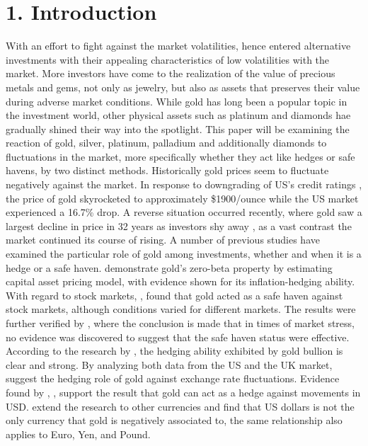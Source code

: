 \documentclass[preprint,authoryear,11pt]{elsarticle}
\begin{document}


\newpage
\section{1. Introduction}
\label{sec:introduction} \glsresetall

\noindent With an effort to fight against the market volatilities, hence entered alternative investments with their appealing characteristics of low volatilities with the market. More investors have come to the realization of the value of precious metals and gems, not only as jewelry, but also as assets that preserves their value during adverse market conditions. While gold has long been a popular topic in the investment world, other physical assets such as platinum and diamonds hae gradually shined their way into the spotlight. This paper will be examining the reaction of gold, silver, platinum, palladium and additionally diamonds to fluctuations in the market, more specifically whether they act like hedges or safe havens, by two distinct methods.
\newline\newline
\noindent Historically gold prices seem to fluctuate negatively against the market. In response to downgrading of US's credit ratings \citet{2011}, the price of gold skyrocketed to approximately \$1900/ounce while the US market experienced a 16.7\% drop. A reverse situation occurred recently, where gold saw a largest decline in price in 32 years as investors shy away \citet{keylist}, as a vast contrast the market continued its course of rising.
\newline\newline
\noindent A number of previous studies have examined the particular role of gold among investments, whether and when it is a hedge or a safe haven. \citet{mccown_is_2006} demonstrate gold's zero-beta property by estimating capital asset pricing model, with evidence shown for its inflation-hedging ability. With regard to stock markets, \citet{baur_is_2009}, \citet{baur_is_2010} found that gold acted as a safe haven against stock markets, although conditions varied for different markets. The results were further verified by \citet{joy_gold_2011}, where the conclusion is made that in times of market stress, no evidence was discovered to suggest that the safe haven status were effective. According to the research by \citet{pullen_comparative_2011}, the hedging ability exhibited by gold bullion is clear and strong. By analyzing both data from the US and the UK market,\citet{ciner_hedges_2013} suggest the hedging role of gold against exchange rate fluctuations. Evidence found by \citet{reboredo_is_2013}, \citet{joy_gold_2011}, \citet{capie_gold_2005} support the result that gold can act as a hedge against movements in USD. \citet{pukthuanthong_gold_2011} extend the research to other currencies and find that US dollars is not the only currency that gold is negatively associated to, the same relationship also applies to Euro, Yen, and Pound.
\end{document}
